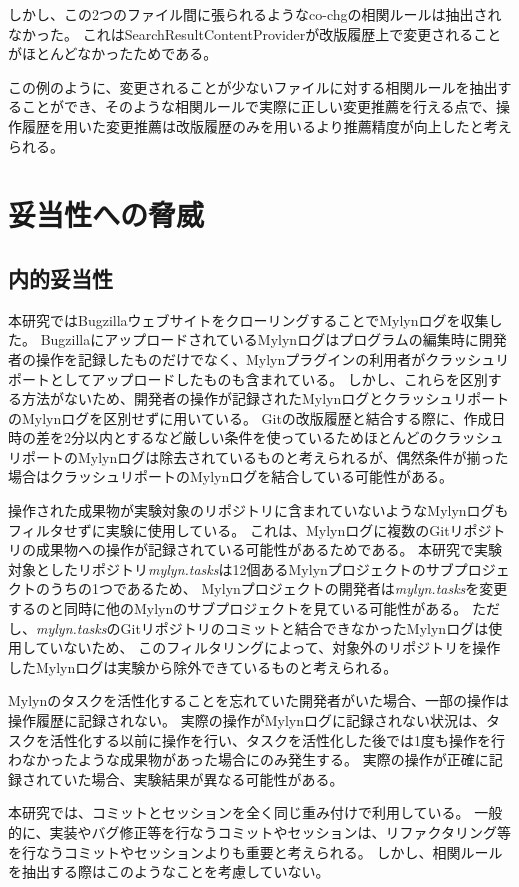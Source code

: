 \documentclass[a4paper]{jsbook}
\begin{document}
しかし、この2つのファイル間に張られるようなco-chgの相関ルールは抽出されなかった。
これはSearchResultContentProviderが改版履歴上で変更されることがほとんどなかったためである。

この例のように、変更されることが少ないファイルに対する相関ルールを抽出することができ、そのような相関ルールで実際に正しい変更推薦を行える点で、操作履歴を用いた変更推薦は改版履歴のみを用いるより推薦精度が向上したと考えられる。

\section{妥当性への脅威}
\subsection{内的妥当性}
本研究ではBugzillaウェブサイトをクローリングすることでMylynログを収集した。
BugzillaにアップロードされているMylynログはプログラムの編集時に開発者の操作を記録したものだけでなく、Mylynプラグインの利用者がクラッシュリポートとしてアップロードしたものも含まれている。
しかし、これらを区別する方法がないため、開発者の操作が記録されたMylynログとクラッシュリポートのMylynログを区別せずに用いている。
Gitの改版履歴と結合する際に、作成日時の差を2分以内とするなど厳しい条件を使っているためほとんどのクラッシュリポートのMylynログは除去されているものと考えられるが、偶然条件が揃った場合はクラッシュリポートのMylynログを結合している可能性がある。

操作された成果物が実験対象のリポジトリに含まれていないようなMylynログもフィルタせずに実験に使用している。
これは、Mylynログに複数のGitリポジトリの成果物への操作が記録されている可能性があるためである。
本研究で実験対象としたリポジトリ{\it mylyn.tasks}は12個あるMylynプロジェクトのサブプロジェクトのうちの1つであるため、
Mylynプロジェクトの開発者は{\it mylyn.tasks}を変更するのと同時に他のMylynのサブプロジェクトを見ている可能性がある。
ただし、{\it mylyn.tasks}のGitリポジトリのコミットと結合できなかったMylynログは使用していないため、
このフィルタリングによって、対象外のリポジトリを操作したMylynログは実験から除外できているものと考えられる。

Mylynのタスクを活性化することを忘れていた開発者がいた場合、一部の操作は操作履歴に記録されない。
実際の操作がMylynログに記録されない状況は、タスクを活性化する以前に操作を行い、タスクを活性化した後では1度も操作を行わなかったような成果物があった場合にのみ発生する。
実際の操作が正確に記録されていた場合、実験結果が異なる可能性がある。

本研究では、コミットとセッションを全く同じ重み付けで利用している。
一般的に、実装やバグ修正等を行なうコミットやセッションは、リファクタリング等を行なうコミットやセッションよりも重要と考えられる。
しかし、相関ルールを抽出する際はこのようなことを考慮していない。
\end{document}
